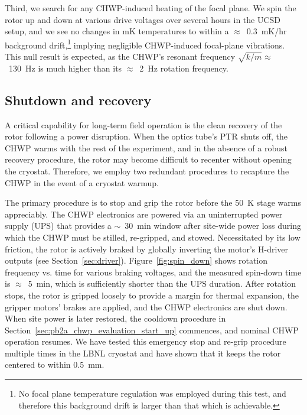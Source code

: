 Third, we search for any CHWP-induced heating of the focal plane. We spin the rotor up and down at various drive voltages over several hours in the UCSD setup, and we see no changes in mK temperatures to within a $\approx$~0.3~mK/hr background drift,\footnote{No focal plane temperature regulation was employed during this test, and therefore this background drift is larger than that which is achievable.} implying negligible CHWP-induced focal-plane vibrations. This null result is expected, as the CHWP's resonant frequency $\sqrt{k / m} \approx$~130~Hz is much higher than its $\approx$~2~Hz rotation frequency.


\subsection{Shutdown and recovery}
\label{sec:pb2a_chwp_evaluation_shutdown_recovery}

A critical capability for long-term field operation is the clean recovery of the rotor following a power disruption. When the optics tube's PTR shuts off, the CHWP warms with the rest of the experiment, and in the absence of a robust recovery procedure, the rotor may become difficult to recenter without opening the cryostat. Therefore, we employ two redundant procedures to recapture the CHWP in the event of a cryostat warmup.

The primary procedure is to stop and grip the rotor before the 50~K stage warms appreciably. The CHWP electronics are powered via an uninterrupted power supply (UPS) that provides a $\sim$~30~min window after site-wide power loss during which the CHWP must be stilled, re-gripped, and stowed. Necessitated by its low friction, the rotor is actively braked by globally inverting the motor's H-driver outputs (see Section~\ref{sec:driver}). Figure~\ref{fig:spin_down} shows rotation frequency vs. time for various braking voltages, and the measured spin-down time is $\approx$~5~min, which is sufficiently shorter than the UPS duration. After rotation stops, the rotor is gripped loosely to provide a margin for thermal expansion, the gripper motors' brakes are applied, and the CHWP electronics are shut down. When site power is later restored, the cooldown procedure in Section~\ref{sec:pb2a_chwp_evaluation_start_up} commences, and nominal CHWP operation resumes. We have tested this emergency stop and re-grip procedure multiple times in the LBNL cryostat and have shown that it keeps the rotor centered to within 0.5~mm.

